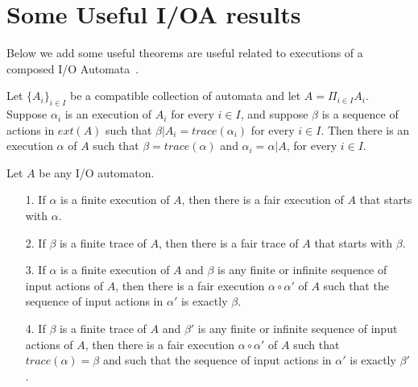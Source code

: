 \section{Some Useful I/OA results}
Below we add some useful  theorems are useful related to  executions of a composed I/O Automata~\cite{Lynch1996}. 


\begin{theorem} \label{thm:paste} %
	Let $\{A_i\}_{i \in  I}$ be a compatible collection of automata and let $A = \Pi_{i \in I}A_i$. Suppose $\alpha_i$ is an execution of $A_i$ for every $i \in I$, and suppose $\beta$ is a sequence of actions in $ext(A)$ such that 
	$\beta | A_i = trace(\alpha_i)$ for every $i \in I$. Then there is an execution $\alpha$ of $A$ such that $\beta = trace(\alpha)$ and $\alpha_i = \alpha | A$, for every $i \in I$.
\end{theorem}

\begin{theorem} \label{thm:extension}
	Let $A$ be any I/O automaton.
	\begin{enumerate}
		\item [1.] If $\alpha$ is a finite execution of $A$, then there is a fair execution of $A$ that starts with $\alpha$.
		\item [2.]  If $\beta$ is a finite trace of $A$, then there is a fair trace of $A$ that starts with $\beta$.  
		\item [3.] If $\alpha$ is a finite execution of $A$  and $\beta$ is any finite or infinite sequence of input actions of $A$, then there is a fair execution  $\alpha \circ \alpha'$ of $A$ such that the sequence of input actions in $\alpha'$ is exactly $\beta$.
		\item [4.]  If $\beta$ is a finite trace of $A$ and $\beta'$ is any finite or infinite sequence of input actions of $A$, then there is a fair execution $\alpha \circ \alpha'$ of $A$ such that $trace(\alpha) = \beta$ and such that the sequence of input actions in $\alpha'$ is exactly $\beta'$.
	\end{enumerate}
\end{theorem}

